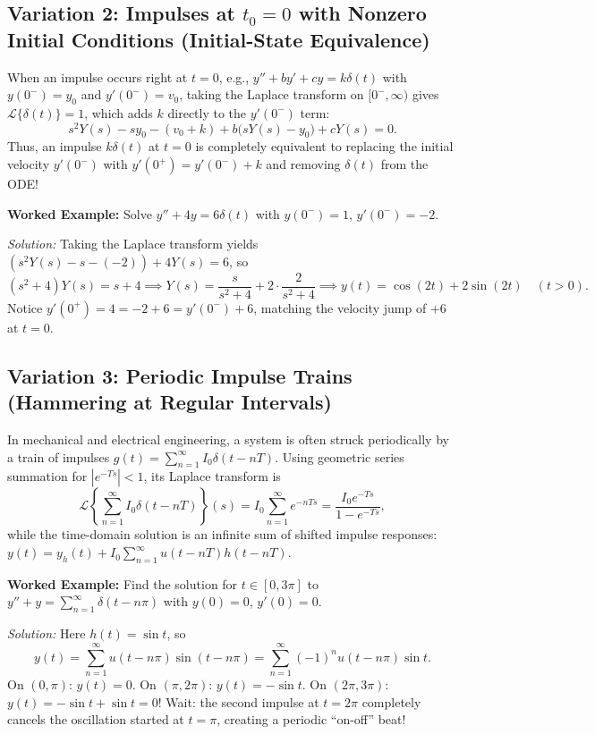 \documentclass[11pt, letterpaper]{article}
\theoremstyle{definition}
\theoremstyle{remark}
\begin{document}
\subsection{Variation 2: Impulses at $t_0 = 0$ with Nonzero Initial Conditions (Initial-State Equivalence)}
When an impulse occurs right at $t = 0$, e.g., $y'' + by' + cy = k\delta(t)$ with $y(0^-) = y_0$ and $y'(0^-) = v_0$, taking the Laplace transform on $[0^-, \infty)$ gives $\mathcal{L}\{\delta(t)\} = 1$, which adds $k$ directly to the $y'(0^-)$ term:
\[
    s^2 Y(s) - s y_0 - (v_0 + k) + b\bigl(sY(s) - y_0\bigr) + cY(s) = 0.
\]
Thus, an impulse $k\delta(t)$ at $t = 0$ is completely equivalent to replacing the initial velocity $y'(0^-)$ with $y'(0^+) = y'(0^-) + k$ and removing $\delta(t)$ from the ODE!

\textbf{Worked Example:} Solve $y'' + 4y = 6\delta(t)$ with $y(0^-) = 1$, $y'(0^-) = -2$.

\emph{Solution:} Taking the Laplace transform yields $(s^2 Y(s) - s - (-2)) + 4Y(s) = 6$, so
\[
    (s^2 + 4)Y(s) = s + 4 \implies Y(s) = \frac{s}{s^2 + 4} + 2\cdot\frac{2}{s^2 + 4} \implies y(t) = \cos(2t) + 2\sin(2t) \quad (t > 0).
\]
Notice $y'(0^+) = 4 = -2 + 6 = y'(0^-) + 6$, matching the velocity jump of $+6$ at $t = 0$.

\subsection{Variation 3: Periodic Impulse Trains (Hammering at Regular Intervals)}
In mechanical and electrical engineering, a system is often struck periodically by a train of impulses $g(t) = \sum_{n=1}^{\infty} I_0 \delta(t - nT)$. Using geometric series summation for $|e^{-Ts}| < 1$, its Laplace transform is
\[
    \mathcal{L}\left\{\sum_{n=1}^{\infty} I_0 \delta(t - nT)\right\}(s) = I_0 \sum_{n=1}^{\infty} e^{-nTs} = \frac{I_0 e^{-Ts}}{1 - e^{-Ts}},
\]
while the time-domain solution is an infinite sum of shifted impulse responses: $y(t) = y_h(t) + I_0 \sum_{n=1}^{\infty} u(t - nT) h(t - nT)$.

\textbf{Worked Example:} Find the solution for $t \in [0, 3\pi]$ to $y'' + y = \sum_{n=1}^{\infty} \delta(t - n\pi)$ with $y(0) = 0$, $y'(0) = 0$.

\emph{Solution:} Here $h(t) = \sin t$, so
\[
    y(t) = \sum_{n=1}^{\infty} u(t - n\pi)\sin(t - n\pi) = \sum_{n=1}^{\infty} (-1)^n u(t - n\pi)\sin t.
\]
On $(0, \pi)$: $y(t) = 0$. On $(\pi, 2\pi)$: $y(t) = -\sin t$. On $(2\pi, 3\pi)$: $y(t) = -\sin t + \sin t = 0$! Wait: the second impulse at $t = 2\pi$ completely cancels the oscillation started at $t = \pi$, creating a periodic ``on-off'' beat!
\end{document}
